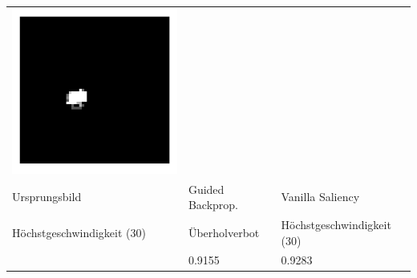 \begin{tabular}{p{4.4cm}p{4.4cm}p{4.4cm}}
	\includegraphics[width=\linewidth]{Images/AnPe/10771_vanil}\\ 
	Ursprungsbild & Guided Backprop. & Vanilla Saliency \\
	Höchstgeschwindigkeit (30) & Überholverbot & Höchstgeschwindigkeit (30)\\
	 & 0.9155 & 0.9283\\

\end{tabular} 


